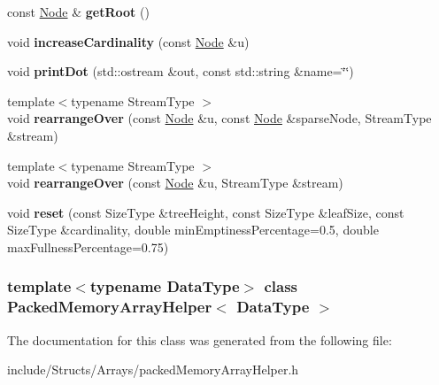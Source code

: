\begin{DoxyCompactItemize}
\item 
\hypertarget{class_packed_memory_array_helper_a9772235f3fbdedaa16abd4d5e96707b0}{
const \hyperlink{class_complete_binary_tree_1_1_node}{Node} \& {\bfseries getRoot} ()}
\label{class_packed_memory_array_helper_a9772235f3fbdedaa16abd4d5e96707b0}

\item 
\hypertarget{class_packed_memory_array_helper_a24072474d662ddd94356845579d34b8b}{
void {\bfseries increaseCardinality} (const \hyperlink{class_complete_binary_tree_1_1_node}{Node} \&u)}
\label{class_packed_memory_array_helper_a24072474d662ddd94356845579d34b8b}

\item 
\hypertarget{class_packed_memory_array_helper_a9e936f8e09a20a6c8adf5da066d11a10}{
void {\bfseries printDot} (std::ostream \&out, const std::string \&name=\char`\"{}\char`\"{})}
\label{class_packed_memory_array_helper_a9e936f8e09a20a6c8adf5da066d11a10}

\item 
\hypertarget{class_packed_memory_array_helper_a931590148a6db5e1f987ee652b0ca37e}{
{\footnotesize template$<$typename StreamType $>$ }\\void {\bfseries rearrangeOver} (const \hyperlink{class_complete_binary_tree_1_1_node}{Node} \&u, const \hyperlink{class_complete_binary_tree_1_1_node}{Node} \&sparseNode, StreamType \&stream)}
\label{class_packed_memory_array_helper_a931590148a6db5e1f987ee652b0ca37e}

\item 
\hypertarget{class_packed_memory_array_helper_a1604cd1249ec01d612e0b1ce23a534ce}{
{\footnotesize template$<$typename StreamType $>$ }\\void {\bfseries rearrangeOver} (const \hyperlink{class_complete_binary_tree_1_1_node}{Node} \&u, StreamType \&stream)}
\label{class_packed_memory_array_helper_a1604cd1249ec01d612e0b1ce23a534ce}

\item 
\hypertarget{class_packed_memory_array_helper_a7c5979358aaff4e7c074a3338075367c}{
void {\bfseries reset} (const SizeType \&treeHeight, const SizeType \&leafSize, const SizeType \&cardinality, double minEmptinessPercentage=0.5, double maxFullnessPercentage=0.75)}
\label{class_packed_memory_array_helper_a7c5979358aaff4e7c074a3338075367c}

\end{DoxyCompactItemize}
\subsubsection*{template$<$typename DataType$>$ class PackedMemoryArrayHelper$<$ DataType $>$}



The documentation for this class was generated from the following file:\begin{DoxyCompactItemize}
\item 
include/Structs/Arrays/packedMemoryArrayHelper.h\end{DoxyCompactItemize}
